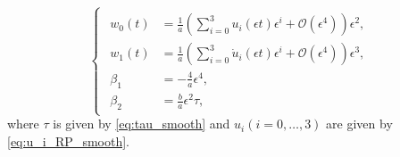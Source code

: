 \begin{equation}
\label{eq:third_order_predictor_smooth_RPM_tau}
\begin{cases}
\begin{aligned}
w_0(t)  &= \frac1{a} \left( \sum_{i=0}^3 u_i(\epsilon t) \epsilon^i +
\mathcal{O}(\epsilon^4) \right)   \epsilon^2, \\
w_1(t)  &= \frac1{a} \left( \sum_{i=0}^3 \dot u_i(\epsilon t) \epsilon^i +
\mathcal{O}(\epsilon^4) \right)   \epsilon^3, \\
\beta_1    &= - \frac{4}{a} \epsilon^4, \\
\beta_2    &= \frac{b}{a}\epsilon^2 \tau,
\end{aligned}
\end{cases}
\end{equation}
where $\tau$ is given by \cref{eq:tau_smooth} and $u_i(i=0,\dots,3)$ are given
by \cref{eq:u_i_RP_smooth}.
